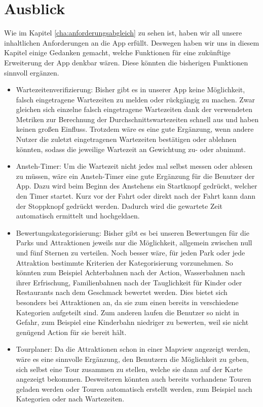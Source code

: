 \chapter{Ausblick}
\label{cha:Ausblick}

Wie im Kapitel \ref{cha:anforderungsabgleich} zu sehen ist, haben wir all unsere inhaltlichen Anforderungen an die App erfüllt. Deswegen haben wir uns in diesem Kapitel einige Gedanken gemacht, welche Funktionen  für eine zukünftige Erweiterung der App denkbar wären. Diese könnten die bisherigen Funktionen sinnvoll ergänzen.

\begin{itemize}
\item Wartezeitenverifizierung: Bisher gibt es in unserer App keine Möglichkeit, falsch eingetragene Wartezeiten zu melden oder rückgängig zu machen. Zwar gleichen sich einzelne falsch eingetragene Wartezeiten dank der verwendeten Metriken zur Berechnung der Durchschnittswartezeiten schnell aus und haben keinen großen Einfluss. Trotzdem wäre es eine gute Ergänzung, wenn andere Nutzer die zuletzt eingetragenen Wartezeiten bestätigen oder ablehnen könnten, sodass die jeweilige Wartezeit an Gewichtung zu- oder abnimmt.
\item Ansteh-Timer: Um die Wartezeit nicht jedes mal selbst messen oder ablesen zu müssen, wäre ein Ansteh-Timer eine gute Ergänzung für die Benutzer der App. Dazu wird beim Beginn des Anstehens ein Startknopf gedrückt, welcher den Timer startet. Kurz vor der Fahrt oder direkt nach der Fahrt kann dann der Stoppknopf gedrückt werden. Dadurch wird die gewartete Zeit automatisch ermittelt und hochgeldaen.
\item Bewertungskategorisierung: Bisher gibt es bei unseren Bewertungen für die Parks und Attraktionen jeweils nur die Möglichkeit, allgemein zwischen null und fünf Sternen zu verteilen. Noch besser wäre, für jeden Park oder jede Attraktion bestimmte Kriterien der Kategorisierung vorzunehmen. So könnten zum Beispiel Achterbahnen nach der Action, Wasserbahnen nach ihrer Erfrischung, Familienbahnen nach der Tauglichkeit für Kinder oder Restaurants nach dem Geschmack bewertet werden. Dies bietet sich besonders bei Attraktionen an, da sie zum einen bereits in verschiedene Kategorien aufgeteilt sind. Zum anderen laufen die Benutzer so nicht in Gefahr, zum Beispiel eine Kinderbahn niedriger zu bewerten, weil sie nicht genügend Action für sie bereit hält.
\item Tourplaner: Da die Attraktionen schon in einer Mapview angezeigt werden, wäre es eine sinnvolle Ergänzung, den Benutzern die Möglichkeit zu geben, sich selbst eine Tour zusammen zu stellen, welche sie dann auf der Karte angezeigt bekommen. Desweiteren könnten auch bereits vorhandene Touren geladen werden oder Touren automatisch erstellt werden, zum Beispiel nach Kategorien oder nach Wartezeiten.
\end{itemize}

